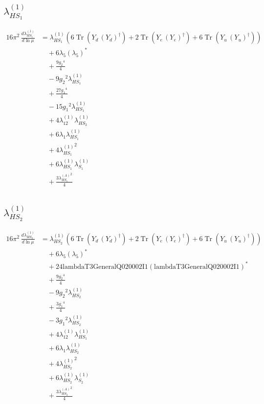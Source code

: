 \documentclass[10pt,a4paper]{article}
\begin{document}
\subsection*{$\lambda_{HS_1}^{(1)}$}
\begin{align*}
16\pi^2\,\frac{d \lambda_{HS_1}^{(1)}}{d\ln\mu} &={\lambda_{HS_1}^{(1)}} (6 \operatorname{Tr}\!\left({Y_d}\,\left({Y_d}\right)^{\dagger}\right)+2 \operatorname{Tr}\!\left({Y_e}\,\left({Y_e}\right)^{\dagger}\right)+6 \operatorname{Tr}\!\left({Y_u}\,\left({Y_u}\right)^{\dagger}\right)) \\
&\quad +6 {\lambda_5} \left({\lambda_5}\right)^{*} \\
&\quad +\frac{9 {g_2}^4}{4} \\
&\quad -9 {g_2}^2 {\lambda_{HS_1}^{(1)}} \\
&\quad +\frac{27 {g_1}^4}{4} \\
&\quad -15 {g_1}^2 {\lambda_{HS_1}^{(1)}} \\
&\quad +4 {\lambda_{12}^{(1)}} {\lambda_{HS_2}^{(1)}} \\
&\quad +6 {\lambda_1} {\lambda_{HS_1}^{(1)}} \\
&\quad +4 {\lambda_{HS_1}^{(1)}}^2 \\
&\quad +6 {\lambda_{HS_1}^{(1)}} {\lambda_{S_1}^{(1)}} \\
&\quad +\frac{3 {\lambda_{HS_1}^{(A)}}^2}{4} \\
\end{align*}
\subsection*{$\lambda_{HS_2}^{(1)}$}
\begin{align*}
16\pi^2\,\frac{d \lambda_{HS_2}^{(1)}}{d\ln\mu} &={\lambda_{HS_2}^{(1)}} (6 \operatorname{Tr}\!\left({Y_d}\,\left({Y_d}\right)^{\dagger}\right)+2 \operatorname{Tr}\!\left({Y_e}\,\left({Y_e}\right)^{\dagger}\right)+6 \operatorname{Tr}\!\left({Y_u}\,\left({Y_u}\right)^{\dagger}\right)) \\
&\quad +6 {\lambda_5} \left({\lambda_5}\right)^{*} \\
&\quad +24 \text{lambdaT3GeneralQ020002I1} \left(\text{lambdaT3GeneralQ020002I1}\right)^{*} \\
&\quad +\frac{9 {g_2}^4}{4} \\
&\quad -9 {g_2}^2 {\lambda_{HS_2}^{(1)}} \\
&\quad +\frac{3 {g_1}^4}{4} \\
&\quad -3 {g_1}^2 {\lambda_{HS_2}^{(1)}} \\
&\quad +4 {\lambda_{12}^{(1)}} {\lambda_{HS_1}^{(1)}} \\
&\quad +6 {\lambda_1} {\lambda_{HS_2}^{(1)}} \\
&\quad +4 {\lambda_{HS_2}^{(1)}}^2 \\
&\quad +6 {\lambda_{HS_2}^{(1)}} {\lambda_{S_2}^{(1)}} \\
&\quad +\frac{3 {\lambda_{HS_2}^{(A)}}^2}{4} \\
\end{align*}
\end{document}
